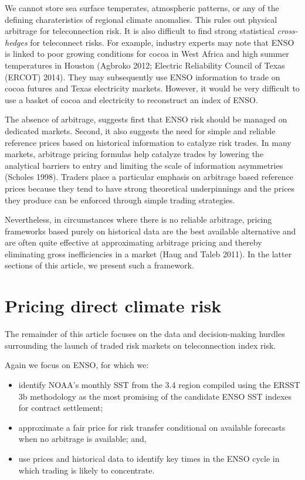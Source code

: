 \documentclass[article]{jss}
\begin{document}
We cannot store sea surface temperates, atmospheric patterns, or any of
the defining charateristics of regional climate anomalies. This rules
out physical arbitrage for teleconnection risk. It is also difficult to
find strong statistical \emph{cross-hedges} for teleconnect risks. For
example, industry experts may note that ENSO is linked to poor growing
conditions for cocoa in West Africa and high summer temperatures in
Houston (Agbroko 2012; Electric Reliability Council of Texas (ERCOT)
2014). They may subsequently use ENSO information to trade on cocoa
futures and Texas electricity markets. However, it would be very
difficult to use a basket of cocoa and electricity to reconstruct an
index of ENSO.

The absence of arbitrage, suggests first that ENSO risk should be
managed on dedicated markets. Second, it also suggests the need for
simple and reliable reference prices based on historical information to
catalyze risk trades. In many markets, arbitrage pricing formulas help
catalyze trades by lowering the analytical barriers to entry and
limiting the scale of information asymmetries (Scholes 1998). Traders
place a particular emphasis on arbitrage based reference prices because
they tend to have strong theoretical underpinnings and the prices they
produce can be enforced through simple trading strategies.

Nevertheless, in circumstances where there is no reliable arbitrage,
pricing frameworks based purely on historical data are the best
available alternative and are often quite effective at approximating
arbitrage pricing and thereby eliminating gross inefficiencies in a
market (Haug and Taleb 2011). In the latter sections of this article, we
present such a framework.

\section{Pricing direct climate risk}\label{pricing-direct-climate-risk}

The remainder of this article focuses on the data and decision-making
hurdles surrounding the launch of traded risk markets on teleconnection
index risk.

Again we focus on ENSO, for which we:

\begin{itemize}
\itemsep1pt\parskip0pt
\item
  identify NOAA's monthly SST from the  3.4 region compiled
  using the ERSST 3b methodology as the most promising of the candidate
  ENSO SST indexes for contract settlement;
\item
  approximate a fair price for risk transfer conditional on available
  forecasts when no arbitrage is available; and,
\item
  use prices and historical data to identify key times in the ENSO cycle
  in which trading is likely to concentrate.
\end{itemize}
\end{document}
